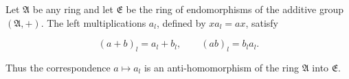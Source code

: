 Let $\mathfrak{A}$ be any ring and let $\mathfrak{E}$ be the ring of endomorphisms of the additive group $(\mathfrak{A}, +)$. The left multiplications $a_l$, defined by $x a_l = ax$, satisfy

$$(a + b)_l = a_l + b_l, \qquad (ab)_l = b_l a_l.$$

Thus the correspondence $a \mapsto a_l$ is an anti-homomorphism of the ring $\mathfrak{A}$ into $\mathfrak{E}$.

